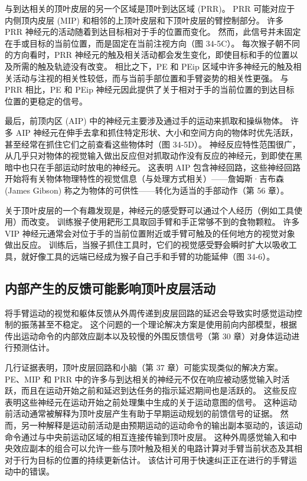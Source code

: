 与到达相关的顶叶皮层的另一个区域是顶叶到达区域 (PRR)。 PRR 可能对应于内侧顶内皮层 (MIP) 和相邻的上顶叶皮层和下顶叶皮层的臂控制部分。 许多 PRR 神经元的活动随着到达目标相对于手的位置而变化。 然而，此信号并未固定在手或目标的当前位置，而是固定在当前注视方向（图 34-5C）。 每次猴子朝不同的方向看时，PRR 神经元的触及相关活动都会发生变化，即使目标和手的位置以及所需的触及轨迹没有改变。 相比之下，PE 和 PEip 区域中许多神经元的触及相关活动与注视的相关性较低，而与当前手部位置和手臂姿势的相关性更强。 与 PRR 相比，PE 和 PEip 神经元因此提供了关于相对于手的当前位置的到达目标位置的更稳定的信号。

最后，前顶内区 (AIP) 中的神经元主要涉及通过手的运动来抓取和操纵物体。 许多 AIP 神经元在伸手去拿和抓住特定形状、大小和空间方向的物体时优先活跃，甚至经常在抓住它们之前查看这些物体时（图 34-5D）。 神经反应特性范围很广，从几乎只对物体的视觉输入做出反应但对抓取动作没有反应的神经元，到即使在黑暗中也只在手部运动时放电的神经元。 这表明 AIP 包含神经回路，这些神经回路开始将有关物体物理特性的视觉信息（与处理方式相关）——詹姆斯·吉布森 (James Gibson) 称之为物体的可供性——转化为适当的手部动作（第 56 章）。

关于顶叶皮层的一个有趣发现是，神经元的感受野可以通过个人经历（例如工具使用）而改变。 训练猴子使用耙形工具取回手臂和手正常够不到的食物颗粒。 许多 VIP 神经元通常会对位于手的当前位置附近或手臂可触及的任何地方的视觉对象做出反应。 训练后，当猴子抓住工具时，它们的视觉感受野会瞬时扩大以吸收工具，就好像工具的远端已经成为猴子自己手和手臂的功能延伸（图 34-6）。


\subsection{内部产生的反馈可能影响顶叶皮层活动}
将手臂运动的视觉和躯体反馈从外周传递到皮层回路的延迟会导致实时感觉运动控制的振荡甚至不稳定。 这个问题的一个理论解决方案是使用前向内部模型，根据传出运动命令的内部效应副本以及较慢的外围反馈信号（第 30 章）对身体运动进行预测估计。

几行证据表明，顶叶皮层回路和小脑（第 37 章）可能实现类似的解决方案。 PE、MIP 和 PRR 中的许多与到达相关的神经元不仅在响应被动感觉输入时活跃，而且在运动开始之前和延迟到达任务的指示延迟期间也是活跃的。 这些反应表明这些神经元在运动开始之前处理集中生成的关于运动意图的信号。 这种运动前活动通常被解释为顶叶皮层产生有助于早期运动规划的前馈信号的证据。 然而，另一种解释是运动前活动是由预期运动的运动命令的输出副本驱动的，该运动命令通过与中央前运动区域的相互连接传输到顶叶皮层。 这种外周感觉输入和中央效应副本的组合可以允许一些与顶叶触及相关的电路计算对手臂当前状态及其相对于行为目标的位置的持续更新估计。 该估计可用于快速纠正正在进行的手臂运动中的错误。

